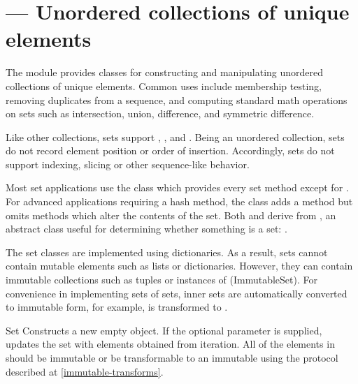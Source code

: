 \section{ ---
         Unordered collections of unique elements}



The  module provides classes for constructing and manipulating
unordered collections of unique elements.  Common uses include membership
testing, removing duplicates from a sequence, and computing standard math
operations on sets such as intersection, union, difference, and symmetric
difference.

Like other collections, sets support , , and
.  Being an unordered collection, sets do not record element
position or order of insertion.  Accordingly, sets do not support indexing,
slicing or other sequence-like behavior.

Most set applications use the  class which provides every set
method except for . For advanced applications requiring
a hash method, the  class adds a 
method but omits methods which alter the contents of the set. Both
 and  derive from , an
abstract class useful for determining whether something is a set:
.

The set classes are implemented using dictionaries.  As a result, sets cannot
contain mutable elements such as lists or dictionaries. However, they can
contain immutable collections such as tuples or instances of
\class(ImmutableSet).  For convenience in implementing sets of sets,
inner sets are automatically converted to immutable form, for example,
 is transformed to
.

\begin{classdesc}{Set}{}
Constructs a new empty  object.  If the optional 
parameter is supplied, updates the set with elements obtained from iteration.
All of the elements in  should be immutable or be transformable
to an immutable using the protocol described at \ref{immutable-transforms}.
\end{classdesc}

